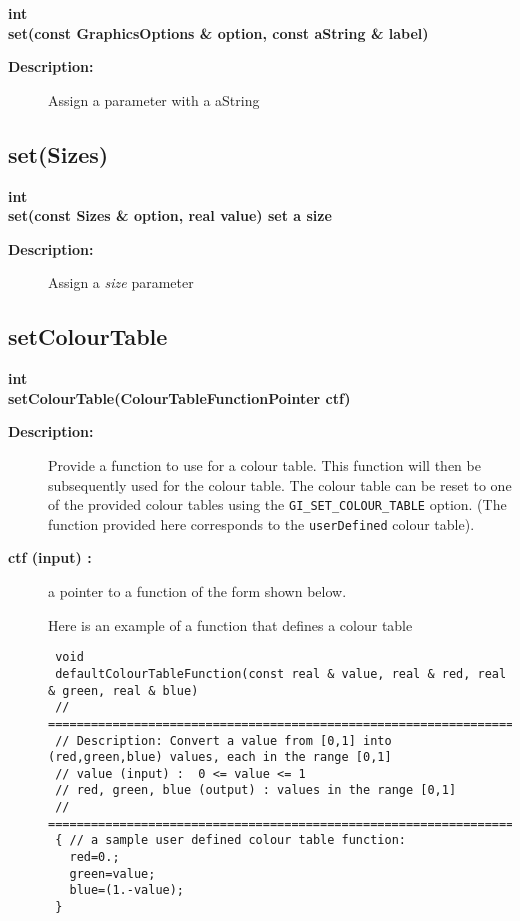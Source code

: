 \begin{flushleft} \textbf{%
int  \\ 
\settowidth{\GraphicsParametersIncludeArgIndent}{set(}%
set(const GraphicsOptions \& option, const aString \& label)
}\end{flushleft}
\begin{description}
\item[{\bf Description:}] 
   Assign a parameter with a aString

\end{description}
\subsection{set(Sizes)}
 
\begin{flushleft} \textbf{%
int  \\ 
\settowidth{\GraphicsParametersIncludeArgIndent}{set(}%
set(const Sizes \& option, real value) set a size
}\end{flushleft}
\begin{description}
\item[{\bf Description:}] 
   Assign a {\it size} parameter

\end{description}
\subsection{setColourTable}
 
\begin{flushleft} \textbf{%
int  \\ 
\settowidth{\GraphicsParametersIncludeArgIndent}{setColourTable(}%
setColourTable(ColourTableFunctionPointer ctf)
}\end{flushleft}
\begin{description}
\item[{\bf Description:}] 
   Provide a function to use for a colour table. This function will then be subsequently used for
   the colour table. The colour table can be reset to one of the provided colour tables
   using the  {\tt GI\_SET\_COLOUR\_TABLE} option. (The function provided here corresponds
   to the {\tt userDefined} colour table).
\item[{\bf ctf (input) :}]  a pointer to a function of the form shown below. 

  Here is an example of a function that defines a colour table
 
 {\footnotesize
 \begin{verbatim}
 void 
 defaultColourTableFunction(const real & value, real & red, real & green, real & blue)
 // =============================================================================================
 // Description: Convert a value from [0,1] into (red,green,blue) values, each in the range [0,1]
 // value (input) :  0 <= value <= 1 
 // red, green, blue (output) : values in the range [0,1]
 // =============================================================================================
 { // a sample user defined colour table function: 
   red=0.;
   green=value;
   blue=(1.-value);
 }
 \end{verbatim}
 }

\end{description}
